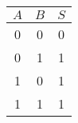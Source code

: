 \begin{tabular}{|c|c||c|}
          \hline
          $A$& $B$&$S$\\
          \hline
          0 & 0 & 0\\
          \hline
          0 & 1 & 1\\
          \hline
          1 & 0 & 1\\
          \hline
          1 & 1 & 1\\
          \hline
\end{tabular}







